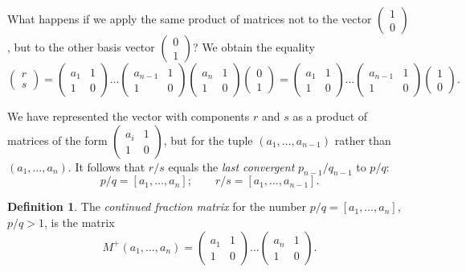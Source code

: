 \documentclass[a4paper,11pt]{amsart}
\theoremstyle{plain}
\theoremstyle{remark}
\theoremstyle{definition}
\newtheorem{definition}[theorem]{Definition}
\numberwithin{equation}{section}
\numberwithin{figure}{section}
\begin{document}
What happens if we apply the same product of matrices not to the vector $\begin{pmatrix}1\\0\end{pmatrix}$, but to the other basis vector $\begin{pmatrix}0\\1\end{pmatrix}$? We obtain the equality
\[
\begin{pmatrix}r\\s
\end{pmatrix}=
\begin{pmatrix}a_1 & 1\\1 & 0
\end{pmatrix}
\dots \begin{pmatrix}a_{n-1} & 1\\1 & 0
\end{pmatrix}
\begin{pmatrix}a_n & 1\\1 & 0
\end{pmatrix}
\begin{pmatrix}0\\1
\end{pmatrix}=
\begin{pmatrix}a_1 & 1\\1 & 0
\end{pmatrix}
\dots \begin{pmatrix}a_{n-1} & 1\\1 & 0
\end{pmatrix}
\begin{pmatrix}1\\0
\end{pmatrix}.
\]

We have represented the vector with components $r$ and $s$ as a product of matrices of the form $\begin{pmatrix}a_i & 1\\1 & 0\end{pmatrix}$, but for the tuple $(a_1, \dots, a_{n-1})$ rather than $(a_1, \dots, a_n)$. It follows that $r/s$ equals the \emph{last convergent} $p_{n-1}/q_{n-1}$ to $p/q$:
\[
p/q = [a_1, \dots, a_n];\qquad r/s = [a_1, \dots, a_{n-1}].
\] 

\begin{definition} The \emph{continued fraction matrix} for the number $p/q = [a_1, \dots, a_n]$, $p/q > 1$, is the matrix
\[
M^+(a_1, \dots, a_n) = \begin{pmatrix}a_1 & 1\\1 & 0
\end{pmatrix}
\dots 
\begin{pmatrix}a_n & 1\\1 & 0
\end{pmatrix}.
\]
\end{definition}
\end{document}
